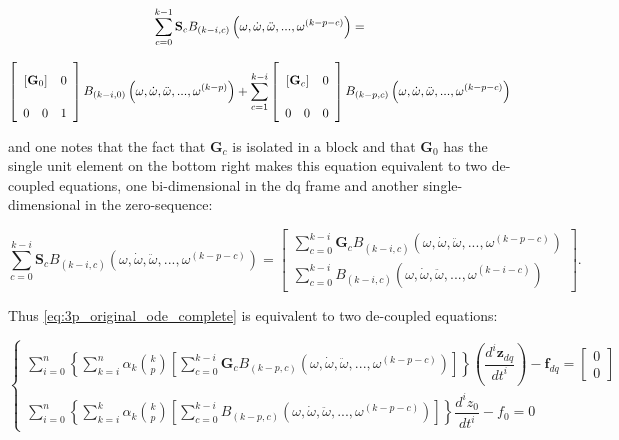 \small
\begin{gather}
	\sum\limits_{c=0}^{k-1} \mathbf{S}_c B_{\left(k-i,c\right)}\left(\omega,\dot{\omega},\ddot{\omega},...,\omega^{(k-p-c)}\right) = \nonumber\\[3mm]
	\left[\begin{array}{ccc} \\[-1mm] \multicolumn{2}{c}{\left[\mathbf{G}_0\right]} & 0\\[5mm] 0 & 0 & 1 \end{array}\right] B_{\left(k-i,0\right)}\left(\omega,\dot{\omega},\ddot{\omega},...,\omega^{(k-p)}\right) + \sum\limits_{c=1}^{k-i} \left[\begin{array}{ccc} \\[-1mm] \multicolumn{2}{c}{\left[\mathbf{G}_c\right]} & 0\\[5mm] 0 & 0 & 0 \end{array}\right] B_{\left(k-p,c\right)}\left(\omega,\dot{\omega},\ddot{\omega},...,\omega^{(k-p-c)}\right)
\end{gather}
\normalsize

	\noindent and one notes that the fact that $\mathbf{G}_c$ is isolated in a block and that $\mathbf{G}_0$ has the single unit element on the bottom right makes this equation equivalent to two de-coupled equations, one bi-dimensional in the dq frame and another single-dimensional in the zero-sequence:

\begin{equation}
	\sum\limits_{c=0}^{k-i} \mathbf{S}_c B_{\left(k-i,c\right)}\left(\omega,\dot{\omega},\ddot{\omega},...,\omega^{(k-p-c)}\right) = 
\left[\begin{array}{c}
\displaystyle\sum\limits_{c=0}^{k-i} \mathbf{G}_c B_{\left(k-i,c\right)}\left(\omega,\dot{\omega},\ddot{\omega},...,\omega^{(k-p-c)}\right) \\[5mm]
\displaystyle\sum\limits_{c=0}^{k-i} B_{\left(k-i,c\right)}\left(\omega,\dot{\omega},\ddot{\omega},...,\omega^{(k-i-c)}\right)
\end{array}\right] .
\end{equation}

	Thus \eqref{eq:3p_original_ode_complete} is equivalent to two de-coupled equations:

\begin{equation}
\left\{\begin{array}{l}
	\displaystyle \sum\limits_{i=0}^n \left\{\sum\limits_{k=i}^{n} \alpha_k {k\choose p} \left[\sum\limits_{c=0}^{k-i} \mathbf{G}_c B_{\left(k-p,c\right)}\left(\omega,\dot{\omega},\ddot{\omega},...,\omega^{(k-p-c)}\right) \right]\right\} \left(\dfrac{d^i \mathbf{z}_{dq}}{dt^i}\right) - \mathbf{f}_{dq}  = \left[\begin{array}{c} 0 \\[3mm] 0 \end{array}\right]\\[5mm]
	\displaystyle \sum\limits_{i=0}^n \left\{\sum\limits_{k=i}^{k} \alpha_k {k\choose p} \left[\sum\limits_{c=0}^{k-i} B_{\left(k-p,c\right)}\left(\omega,\dot{\omega},\ddot{\omega},...,\omega^{(k-p-c)}\right)\right] \right\} \dfrac{d^i z_0}{dt^i} - f_0 = 0
\end{array}\right.
\end{equation}

